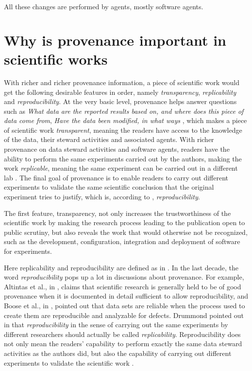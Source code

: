All these changes are performed by agents, mostly software agents. 

\section{Why is provenance important in scientific works}
With richer and richer provenance information, a piece of scientific work would get the following desirable features in order, namely \emph{transparency}, \emph{replicability} and \emph{reproducibility}. At the very basic level, provenance helps answer questions such as \emph{What data are the reported results based on, and where does this piece of data come from}, \emph{Have the data been modified, in what ways} \cite{davidson2008provenance}, which makes a piece of scientific work \emph{transparent}, meaning the readers have access to the knowledge of the data, their steward activities and associated agents.  With richer provenance on data steward activities and software agents, readers have the ability to perform the same experiments carried out by the authors, making the work \emph{replicable}, meaning the same experiment can be carried out in a different lab . The final goal of provenance is to enable readers to carry out different experiments to validate the same scientific conclusion that the original experiment tries to justify, which is, according to \cite{drummond2009replicability}, \emph{reproducibility}.

The first feature, transparency, not only increases the trustworthiness of the scientific work by making the research process leading to the publication open to public scrutiny, but also reveals the work that would otherwise not be recognized, such as the development, configuration, integration and deployment of software for experiments. \cite{goble2014better} 

Here replicability and reproducibility are defined as in \cite{drummond2009replicability}. In the last decade, the word \emph{reproducibility} pops up a lot in discussions about provenance. For example, Altintas et al., in \cite{altintas2004kepler}, claims that scientific research is generally held to be of good provenance when it is documented in detail sufficient to allow reproducibility, and Boose et al., in \cite{boose2007ensuring}, pointed out that data sets are reliable when the process used to create them are reproducible and analyzable for defects. Drummond pointed out in \cite{drummond2009replicability} that \emph{reproducibility} in the sense of carrying out the same experiments by different researchers should actually be called \emph{replicability}. 
Reproducibility does not only mean the readers' capability to perform exactly the same data steward activities as the authors did, but also the capability of carrying out different experiments to validate the scientific work \cite{drummond2009replicability}. 
\cite{goble2014better}



